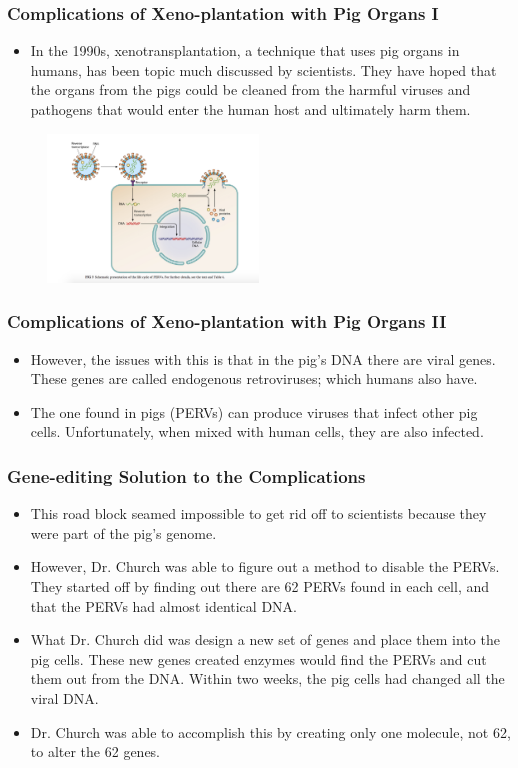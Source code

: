 \documentclass{beamer}
\begin{document}
\begin{frame}
\frametitle{Complications of Xeno-plantation with Pig Organs I}
\begin{itemize}
\item
In the 1990s, xenotransplantation, a technique that uses pig organs in humans, has been topic much discussed by scientists. They have hoped that the organs from the pigs could be cleaned from the harmful viruses and pathogens that would enter the human host and ultimately harm them. 
\end{itemize}
\begin{figure}[h!]
  \centering
    \includegraphics[width=0.5\textwidth]{lifecycle.png}
\end{figure}
\end{frame}

\begin{frame}
\frametitle{Complications of Xeno-plantation with Pig Organs II}
\begin{itemize}
\item
However, the issues with this is that in the pig’s DNA there are viral genes. These genes are called endogenous retroviruses; which humans also have. 
\item
The one found in pigs (PERVs) can produce viruses that infect other pig cells. Unfortunately, when mixed with human cells, they are also infected. 
\end{itemize}
\end{frame}


\begin{frame}
\frametitle{Gene-editing Solution to the Complications}
\begin{itemize}
\item
This road block seamed impossible to get rid off to scientists because they were part of the pig’s genome. 
\item
However, Dr. Church was able to figure out a method to disable the PERVs. They started off by finding out there are 62 PERVs found in each cell, and that the PERVs had almost identical DNA. 
\item
What Dr. Church did was design a new set of genes and place them into the pig cells. These new genes created enzymes would find the PERVs and cut them out from the DNA. Within two weeks, the pig cells had changed all the viral DNA. 
\item
Dr. Church was able to accomplish this by creating only one molecule, not 62, to alter the 62 genes.
\end{itemize}
\end{frame}
\end{document}
